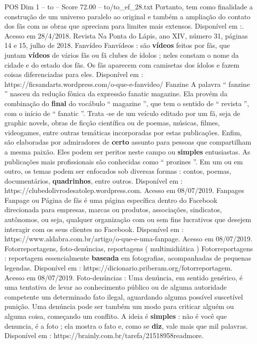 \begin{textsample}{POS Dim 1 – to – Score 72.00 – to/to\_ef\_28.txt}
Portanto, tem como finalidade a construção de um universo paralelo ao original e também a ampliação do contato dos fãs com as obras que apreciam para limites mais extensos.
Disponível em :.
Acesso em 28/4/2018.
Revista Na Ponta do Lápis, ano XIV, número 31, páginas 14 e 15, julho de 2018.
Fanvídeo Fanvídeos : são \textbf{vídeos} feitos por fãs, que juntam \textbf{vídeos} de vários fãs ou fã clubes de ídolos ; neles constam o nome da cidade e do estado dos fãs.
Os fãs aparecem com camisetas dos ídolos e fazem coisas diferenciadas para eles.
Disponível em : https://ficsandarts.wordpress.com/o-que-e-fanvideo/ Fanzine A palavra “ fanzine ” nasceu da redução fônica da expressão fanatic magazine.
Ela provém da combinação do \textbf{final} do vocábulo “ magazine ”, que tem o sentido de “ revista ”, com o início de “ fanatic ”.
Trata -se de um veículo editado por um fã, seja de graphic novels, obras de ficção científica ou de poemas, músicas, filmes, videogames, entre outras temáticas incorporadas por estas publicações.
Enfim, são elaboradas por admiradores de \textbf{certo} assunto para pessoas que compartilham a mesma paixão.
Eles podem ser peritos neste campo ou \textbf{simples} entusiastas.
As publicações mais profissionais são conhecidas como “ prozines ”.
Em um ou em outro, os temas podem ser enfocados sob diversas formas : contos, poemas, documentários, \textbf{quadrinhos}, entre outros.
Disponível em : https://clubedolivrodesatolep.wordpress.com.
Acesso em 08/07/2019.
Fanpages Fanpage ou Página de fãs é uma página específica dentro do Facebook direcionada para empresas, marcas ou produtos, associações, sindicatos, autônomos, ou seja, qualquer organização com ou sem fins lucrativos que desejem interagir com os seus clientes no Facebook.
Disponível em : https://www.aldabra.com.br/artigo/o-que-e-uma-fanpage.
Acesso em 08/07/2019.
Fotorreportagens, foto-denúncias, reportagens ( multimidiática ) Fotorreportagens : reportagem essencialmente \textbf{baseada} em fotografias, acompanhadas de pequenas legendas.
Disponível em : https://dicionario.priberam.org/fotorreportagem.
Acesso em 08/07/2019.
Foto-denúncias : Uma denúncia, em sentido genérico, é uma tentativa de levar ao conhecimento público ou de alguma autoridade competente um determinado fato ilegal, aguardando alguma possível suscetível punição.
Uma denúncia pode ser também um modo para criticar alguém ou alguma coisa, começando um conflito.
A ideia é \textbf{simples} : não é você que denuncia, é a foto ; ela mostra o fato e, como se \textbf{diz}, vale mais que mil palavras.
Disponível em : https://brainly.com.br/tarefa/21518958readmore.

\end{textsample}
